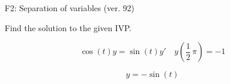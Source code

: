 \begin{exercise}
  \begin{exerciseTitle}F2: Separation of variables (ver. 92)\end{exerciseTitle}
  \begin{exerciseStatement}
    
Find the solution to the given IVP.

    
\[\cos\left(t\right) y= \sin\left(t\right) y'\hspace{1em} y\left( \frac{1}{2} \, \pi \right)= -1\]

  \end{exerciseStatement}
  \begin{exerciseAnswer}
    
\[y= -\sin\left(t\right)\]

  \end{exerciseAnswer}
\end{exercise}